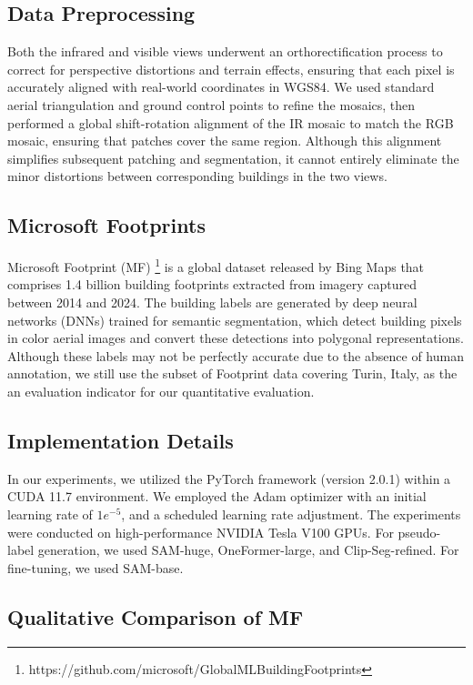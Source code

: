 \documentclass{article}
\theoremstyle{plain}
\theoremstyle{definition}
\theoremstyle{remark}
\begin{document}
\subsection{Data Preprocessing}
Both the infrared and visible views underwent an orthorectification process to correct for perspective distortions and terrain effects, ensuring that each pixel is accurately aligned with real-world coordinates in WGS84. We used standard aerial triangulation and ground control points to refine the mosaics, then performed a global shift-rotation alignment of the IR mosaic to match the RGB mosaic, ensuring that patches cover the same region. Although this alignment simplifies subsequent patching and segmentation, it cannot entirely eliminate the minor distortions between corresponding buildings in the two views.

\subsection{Microsoft Footprints}
Microsoft  Footprint (MF) \footnote{https://github.com/microsoft/GlobalMLBuildingFootprints} is a global dataset released by Bing Maps that comprises 1.4 billion building footprints extracted from imagery captured between 2014 and 2024. The building labels are generated by deep neural networks (DNNs) trained for semantic segmentation, which detect building pixels in color aerial images and convert these detections into polygonal representations. Although these labels may not be perfectly accurate due to the absence of human annotation, we still use the subset of Footprint data covering Turin, Italy, as the an evaluation indicator for our quantitative evaluation.

\subsection{Implementation Details}
In our experiments, we utilized the PyTorch framework (version 2.0.1) within a CUDA 11.7 environment. We employed the Adam optimizer with an initial learning rate of $1e^{-5}$, and a scheduled learning rate adjustment. The experiments were conducted on high-performance NVIDIA Tesla V100 GPUs. For pseudo-label generation, we used SAM-huge, OneFormer-large, and Clip-Seg-refined. For fine-tuning, we used SAM-base.
\subsection{Qualitative Comparison of MF}
\end{document}
